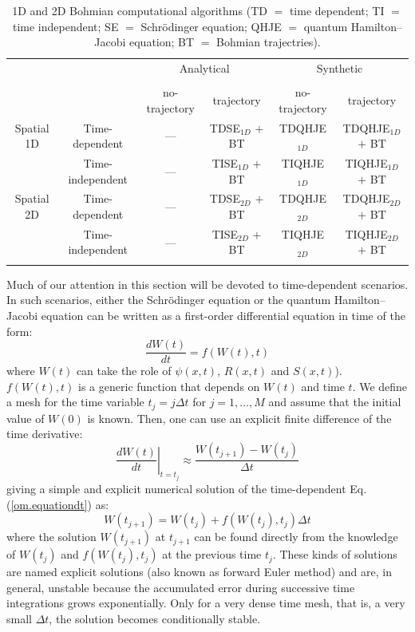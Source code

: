 \documentclass[nofootinbib, secnumarabic, amsmath, nobibnotes,10pt,aps,pra]{revtex4-1}
\newcommand{\eref}[1]{Eq. (\ref{#1})}
\begin{document}
\begin{table}
\centering
\caption{1D and 2D Bohmian computational algorithms (TD $=$ time dependent; TI $=$ time independent; SE $=$ Schr\"odinger equation; QHJE $=$ quantum Hamilton--Jacobi equation; BT $=$ Bohmian trajectries).}{%
\begin{tabular}{@{}cccccc@{}} \toprule
 & & \multicolumn{2}{c}{Analytical} & \multicolumn{2}{c}{Synthetic} \\
 \cline{3-6}\\[-10pt]
 & & no-trajectory & trajectory & no-trajectory & trajectory \\ \colrule
 Spatial 1D & Time-dependent & --- & TDSE$_{1D}$ $+$ BT & TDQHJE$_{1D}$ & TDQHJE$_{1D}$ $+$ BT\\
 & Time-independent & --- & TISE$_{1D}$ $+$ BT & TIQHJE$_{1D}$ & TIQHJE$_{1D}$ $+$ BT\\ \botrule
 Spatial 2D & Time-dependent & --- & TDSE$_{2D}$ $+$ BT & TDQHJE$_{2D}$ & TDQHJE$_{2D}$ $+$ BT\\
 & Time-independent & --- & TISE$_{2D}$ $+$ BT & TIQHJE$_{2D}$ & TIQHJE$_{2D}$ $+$ BT\\ \botrule
\end{tabular}}\label{tblA.1}
\end{table}

Much of our attention in this section will be devoted to
time-dependent scenarios. In such scenarios, either the
Schr\"odinger equation or the quantum Hamilton--Jacobi equation can
be written as a first-order differential equation in time of the
form:\enlargethispage{-1pc}
\begin{equation}
\label{om.equationdt}
\frac {dW(t)} {dt} = f(W(t),t)
\end{equation}
where $W(t)$ can take the role of $\psi(x,t)$, $R(x,t)$ and
$S(x,t)$). $f(W(t),t)$ is a generic function that depends on $W(t)$
and time $t$.  We define a mesh for the time variable $t_j = j
\Delta t$ for $j = 1,\ldots,M$ and assume that the initial value of
$W(0)$ is known. Then, one can use an explicit finite difference of
the time derivative:
\begin{equation}
\left.\frac {dW(t)} {dt}\right|_{t = t_j} \approx \frac {W(t_{j + 1})-W(t_j)} {\Delta t}
\end{equation}
giving a simple and explicit numerical solution of the time-dependent \eref{om.equationdt} as:
\begin{equation}
\label{om.explicit}
W(t_{j + 1}) = W(t_j) + f(W(t_j),t_j) \Delta t
\end{equation}
where the solution $W(t_{j + 1})$ at $t_{j + 1}$ can be found
directly from the knowledge of $W(t_j)$ and $f(W(t_j),t_j)$ at the
previous time $t_j$. These kinds of solutions are named explicit
solutions  (also known as forward Euler method) and are, in general,
unstable because the accumulated error during successive time integrations grows
exponentially. Only for a very dense time mesh, that is, a very
small $\Delta t$, the solution becomes conditionally stable.
\end{document}
